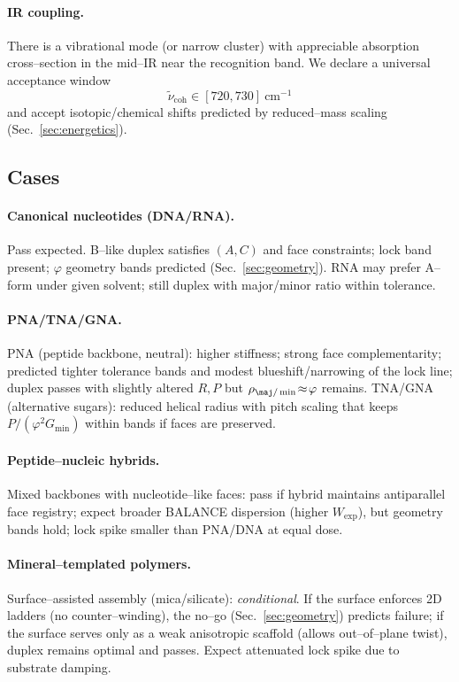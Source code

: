 \documentclass[11pt]{article}
\begin{document}
\paragraph{IR coupling.}
There is a vibrational mode (or narrow cluster) with appreciable absorption cross–section in the mid–IR near the recognition band. We declare a universal acceptance window
\[
\tilde\nu_{\mathrm{coh}}\in[720,730]~\mathrm{cm^{-1}}
\]
and accept isotopic/chemical shifts predicted by reduced–mass scaling (Sec.~\ref{sec:energetics}).

\subsection{Cases}\label{sec:cases}
\paragraph{Canonical nucleotides (DNA/RNA).}
Pass expected. B–like duplex satisfies $(A,C)$ and face constraints; lock band present; $\varphi$ geometry bands predicted (Sec.~\ref{sec:geometry}). RNA may prefer A–form under given solvent; still duplex with major/minor ratio within tolerance.

\paragraph{PNA/TNA/GNA.}
PNA (peptide backbone, neutral): higher stiffness; strong face complementarity; predicted tighter tolerance bands and modest blueshift/narrowing of the lock line; duplex passes with slightly altered $R,P$ but $\rho_{\maj/\min}\!\approx\!\varphi$ remains. TNA/GNA (alternative sugars): reduced helical radius with pitch scaling that keeps $P/(\varphi^2 G_{\min})$ within bands if faces are preserved.

\paragraph{Peptide–nucleic hybrids.}
Mixed backbones with nucleotide–like faces: pass if hybrid maintains antiparallel face registry; expect broader BALANCE dispersion (higher $W_{\mathrm{exp}}$), but geometry bands hold; lock spike smaller than PNA/DNA at equal dose.

\paragraph{Mineral–templated polymers.}
Surface–assisted assembly (mica/silicate): \emph{conditional}. If the surface enforces 2D ladders (no counter–winding), the no–go (Sec.~\ref{sec:geometry}) predicts failure; if the surface serves only as a weak anisotropic scaffold (allows out–of–plane twist), duplex remains optimal and passes. Expect attenuated lock spike due to substrate damping.
\end{document}
